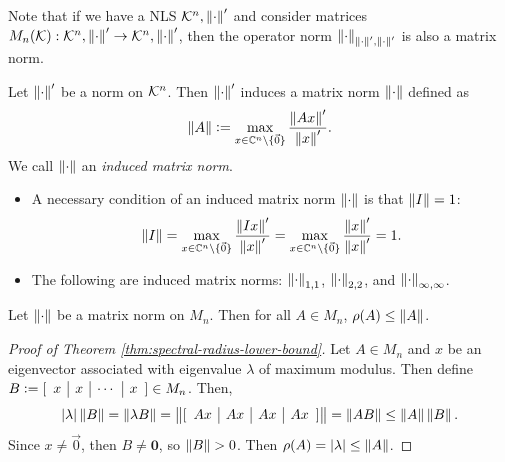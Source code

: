\noindent Note that if we have a NLS $\mathcal{K}^n, \left\lVert\cdot\right\rVert'$ and consider matrices $M_n(\mathcal{K}): \mathcal{K}^n, \left\lVert\cdot\right\rVert' \rightarrow \mathcal{K}^n, \left\lVert\cdot\right\rVert'$, then the operator norm $\left\lVert\cdot\right\rVert_{\left\lVert\cdot\right\rVert', \left\lVert\cdot\right\rVert'}$ is also a matrix norm.

\begin{definition}
\label{def:induced-matrix-norm}
Let $\left\lVert\cdot\right\rVert'$ be a norm on $\mathcal{K}^n$. Then $\left\lVert\cdot\right\rVert'$ induces a matrix norm $\left\lVert\cdot\right\rVert$ defined as
\[
    \left\lVert A\right\rVert \vcentcolon= \max_{x \in \mathbb C^n\setminus\{\Vec{0}\}} \frac{\left\lVert Ax\right\rVert'}{\left\lVert x\right\rVert'}.
\]
We call $\left\lVert\cdot\right\rVert$ an \textit{induced matrix norm}.
\begin{itemize}
    \item A necessary condition of an induced matrix norm $\left\lVert\cdot\right\rVert$ is that $\left\lVert I\right\rVert = 1$:
    \[
        \left\lVert I\right\rVert = \max_{x \in \mathbb C^n\setminus\{\Vec{0}\}} \frac{\left\lVert Ix\right\rVert'}{\left\lVert x\right\rVert'} = \max_{x \in \mathbb C^n\setminus\{\Vec{0}\}} \frac{\left\lVert x\right\rVert'}{\left\lVert x\right\rVert'} = 1.
    \]
    \item The following are induced matrix norms: $\left\lVert\cdot\right\rVert_{1,1}$, $\left\lVert\cdot\right\rVert_{2,2}$, and $\left\lVert\cdot\right\rVert_{\infty, \infty}$.
\end{itemize}
\end{definition}

\begin{theorem}
\label{thm:spectral-radius-lower-bound}
Let $\left\lVert\cdot\right\rVert$ be a matrix norm on $M_n$. Then for all $A \in M_n$, $\rho(A) \le \left\lVert A\right\rVert$.
\end{theorem}

\begin{proof}[Proof of Theorem \ref{thm:spectral-radius-lower-bound}]
Let $A \in M_n$ and $x$ be an eigenvector associated with eigenvalue $\lambda$ of maximum modulus. Then define $B \vcentcolon= [\begin{array}{c|c|c|c}x & x & \cdots & x\end{array}] \in M_n$. Then, 
\[
    |\lambda|\left\lVert B\right\rVert = \left\lVert\lambda B\right\rVert = \left\lVert[\begin{array}{c|c|c|c} Ax & Ax & Ax & Ax
    \end{array}]\right\rVert = \left\lVert AB\right\rVert \le \left\lVert A\right\rVert\left\lVert B\right\rVert.
\]
Since $x \not= \Vec{0}$, then $B \not= \mathbf{0}$, so $\left\lVert B\right\rVert > 0$. Then $\rho(A) = |\lambda| \le \left\lVert A\right\rVert$.
\end{proof}

